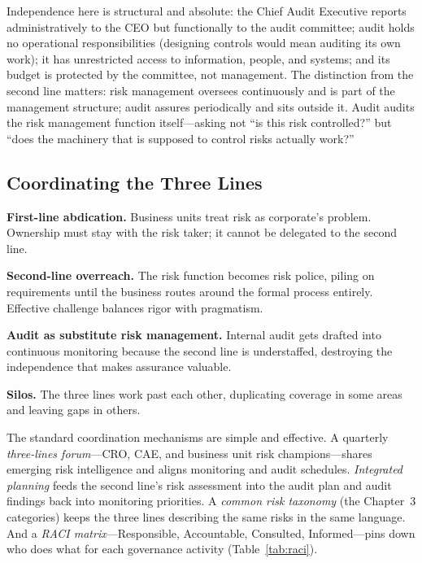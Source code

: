 \documentclass[11pt,openany]{book}
\begin{document}
Independence here is structural and absolute: the Chief Audit Executive
reports administratively to the CEO but functionally to the audit committee;
audit holds no operational responsibilities (designing controls would mean
auditing its own work); it has unrestricted access to information, people,
and systems; and its budget is protected by the committee, not management.
The distinction from the second line matters: risk management oversees
continuously and is part of the management structure; audit assures
periodically and sits outside it. Audit audits the risk management function
itself---asking not ``is this risk controlled?'' but ``does the machinery
that is supposed to control risks actually work?''

\subsection{Coordinating the Three Lines}

\begin{commonpitfall}
\textbf{First-line abdication.} Business units treat risk as corporate's
problem. Ownership must stay with the risk taker; it cannot be delegated to
the second line.

\textbf{Second-line overreach.} The risk function becomes risk police, piling
on requirements until the business routes around the formal process entirely.
Effective challenge balances rigor with pragmatism.

\textbf{Audit as substitute risk management.} Internal audit gets drafted
into continuous monitoring because the second line is understaffed,
destroying the independence that makes assurance valuable.

\textbf{Silos.} The three lines work past each other, duplicating coverage in
some areas and leaving gaps in others.
\end{commonpitfall}

The standard coordination mechanisms are simple and effective. A quarterly
\emph{three-lines forum}---CRO, CAE, and business unit risk
champions---shares emerging risk intelligence and aligns monitoring and audit
schedules. \emph{Integrated planning} feeds the second line's risk assessment
into the audit plan and audit findings back into monitoring priorities. A
\emph{common risk taxonomy} (the Chapter~3 categories) keeps the three lines
describing the same risks in the same language. And a \emph{RACI
matrix}---Responsible, Accountable, Consulted, Informed---pins down who does
what for each governance activity
(Table~\ref{tab:raci}).
\end{document}
